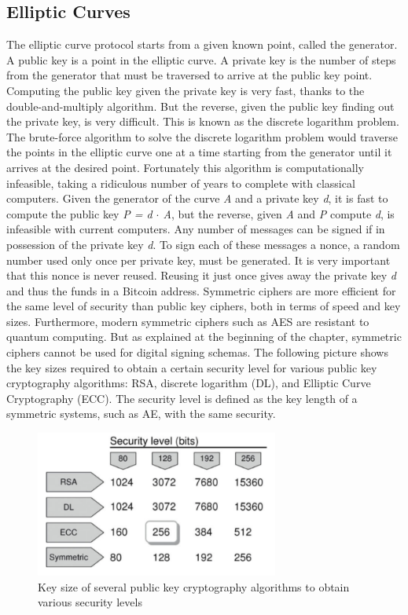 \documentclass{article}
\begin{document}
\subsection*{Elliptic Curves}
The elliptic curve protocol starts from a given known point, called the generator. A public key is a point in the elliptic curve. A private key is the number of steps from the generator that must be traversed to arrive at the public key point. Computing the public key given the private key is very fast, thanks to the double-and-multiply algorithm. But the reverse, given the public key finding out the private key, is very difficult. This is known as the discrete logarithm problem. The brute-force algorithm to solve the discrete logarithm problem would traverse the points in the elliptic curve one at a time starting from the generator until it arrives at the desired point. Fortunately this algorithm is computationally infeasible, taking a ridiculous number of years to complete with classical computers.\newline
Given the generator of the curve \textit{A} and a private key \textit{d}, it is fast to compute the public key \textit{P = d \(\cdot\) A}, but the reverse, given \textit{A} and \textit{P} compute \textit{d}, is infeasible with current computers. Any number of messages can be signed if in possession of the private key \textit{d}. To sign each of these messages a nonce, a random number used only once per private key, must be generated. It is very important that this nonce is never reused. Reusing it just once gives away the private key \textit{d} and thus the funds in a Bitcoin address. Symmetric ciphers are more efficient for the same level of security than public key ciphers, both in terms of speed and key sizes. Furthermore, modern symmetric ciphers such as AES are resistant to quantum computing. But as explained at the beginning of the chapter, symmetric ciphers cannot be used for digital signing schemas. The following picture shows the key sizes required to obtain a certain security level for various public key cryptography algorithms: RSA, discrete logarithm (DL), and Elliptic Curve Cryptography (ECC). The security level is defined as the key length of a symmetric systems, such as AE, with the same security.

\begin{figure}[H]
    \centering
    \includegraphics[width=8cm]{images/11.png}
    \captionsetup{width=.8\linewidth}
    \caption{Key size of several public key cryptography algorithms to obtain various security levels}
\end{figure}
\end{document}
